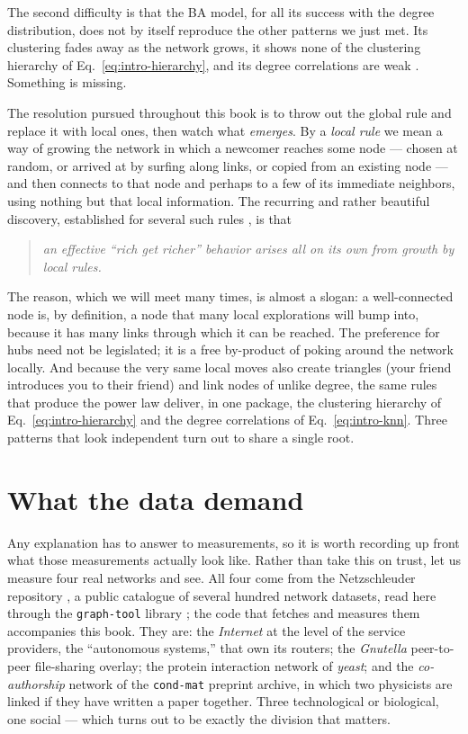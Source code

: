 The second difficulty is that the BA model, for all its success with the degree
distribution, does not by itself reproduce the other patterns we just met. Its
clustering fades away as the network grows, it shows none of the clustering
hierarchy of Eq.~\eqref{eq:intro-hierarchy}, and its degree correlations are weak
\citep{albert2002,vazquez2003}. Something is missing.

The resolution pursued throughout this book is to throw out the global rule and
replace it with local ones, then watch what \emph{emerges}. By a \emph{local
rule} we mean a way of growing the network in which a newcomer reaches some node
--- chosen at random, or arrived at by surfing along links, or copied from an
existing node --- and then connects to that node and perhaps to a few of its
immediate neighbors, using nothing but that local information. The recurring and
rather beautiful discovery, established for several such rules
\citep{vazquez2003}, is that
\begin{quote}
\emph{an effective ``rich get richer'' behavior arises all on its own from
growth by local rules.}
\end{quote}
The reason, which we will meet many times, is almost a slogan: a well-connected
node is, by definition, a node that many local explorations will bump into,
because it has many links through which it can be reached. The preference for
hubs need not be legislated; it is a free by-product of poking around the network
locally. And because the very same local moves also create triangles (your
friend introduces you to their friend) and link nodes of unlike degree, the same
rules that produce the power law deliver, in one package, the clustering
hierarchy of Eq.~\eqref{eq:intro-hierarchy} and the degree correlations of
Eq.~\eqref{eq:intro-knn}. Three patterns that look independent turn out to share
a single root.

\section{What the data demand}
\label{sec:intro-data}

Any explanation has to answer to measurements, so it is worth recording up front
what those measurements actually look like. Rather than take this on trust, let us
measure four real networks and see. All four come from the Netzschleuder
repository \citep{netzschleuder}, a public catalogue of several hundred network
datasets, read here through the \texttt{graph-tool} library \citep{peixoto2014};
the code that fetches and measures them accompanies this book. They are: the
\emph{Internet} at the level of the service providers, the ``autonomous
systems,'' that own its routers; the \emph{Gnutella} peer-to-peer file-sharing
overlay; the protein interaction network of \emph{yeast}; and the
\emph{co-authorship} network of the \texttt{cond-mat} preprint archive, in which
two physicists are linked if they have written a paper together. Three
technological or biological, one social --- which turns out to be exactly the
division that matters.

